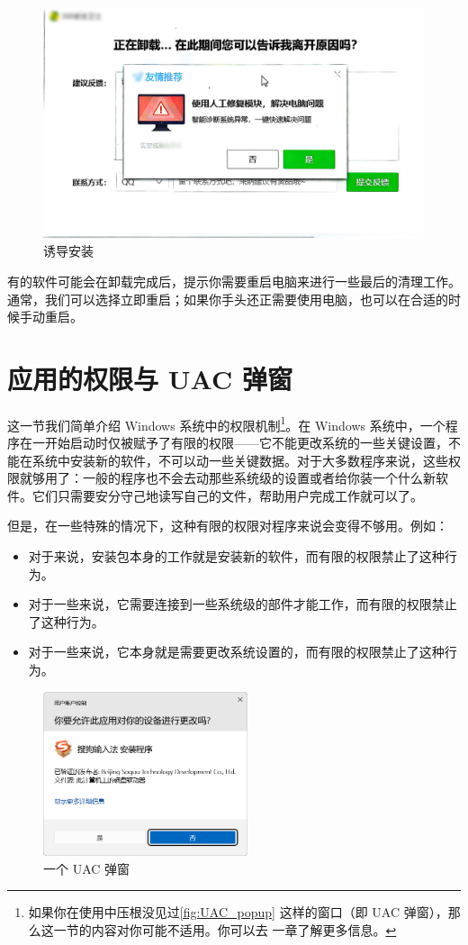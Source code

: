 \begin{figure}[htb!]
  \centering
  \includegraphics[width=.6\textwidth]{assets/basic/Recommending_others_during_uninstallation.png}
  \caption{诱导安装}
  \label{Confusing_Uninstall}
\end{figure}

有的软件可能会在卸载完成后，提示你需要重启电脑来进行一些最后的清理工作。通常，我们可以选择立即重启；如果你手头还正需要使用电脑，也可以在合适的时候手动重启。

\section{应用的权限与 UAC 弹窗}

这一节我们简单介绍 Windows 系统中的权限机制\footnote{如果你在使用中压根没见过\autoref{fig:UAC_popup} 这样的窗口（即 UAC 弹窗），那么这一节的内容对你可能不适用。你可以去 一章了解更多信息。}。在 Windows 系统中，一个程序在一开始启动时仅被赋予了有限的权限——它不能更改系统的一些关键设置，不能在系统中安装新的软件，不可以动一些关键数据。对于大多数程序来说，这些权限就够用了：一般的程序也不会去动那些系统级的设置或者给你装一个什么新软件。它们只需要安分守己地读写自己的文件，帮助用户完成工作就可以了。

但是，在一些特殊的情况下，这种有限的权限对程序来说会变得不够用。例如：

\begin{itemize}
  \item 对于来说，安装包本身的工作就是安装新的软件，而有限的权限禁止了这种行为。
  \item 对于一些来说，它需要连接到一些系统级的部件才能工作，而有限的权限禁止了这种行为。
  \item 对于一些来说，它本身就是需要更改系统设置的，而有限的权限禁止了这种行为。
\end{itemize}

\begin{figure}
  \centering
  \includegraphics[width=6cm]{assets/basic/UAC_popup.png}
  \caption{一个 UAC 弹窗}
  \label{fig:UAC_popup}
\end{figure}

